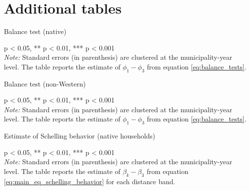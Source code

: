 \documentclass[../main.tex]{subfiles}
\begin{document}
\section{Additional tables}





\begin{table}[H]
    \centering
    \caption{Balance test (native)}
    \resizebox{\textwidth}{!}{}
    \label{tab:balance_test_native_full}
    \begin{tablenotes}[flushleft]
\item \scriptsize * p < 0.05, ** p < 0.01, *** p < 0.001 \\ \textit{Note:} Standard errors (in parenthesis) are clustered at the municipality-year level. The table reports the estimate of $\phi_1 - \phi_3$ from equation \ref{eq:balance_tests}. 
\end{tablenotes}
\end{table}

\begin{table}[H]
    \centering
    \caption{Balance test (non-Western)}
    \resizebox{\textwidth}{!}{}
    \label{tab:balance_test_non_west_full}
    \begin{tablenotes}[flushleft]
\item \scriptsize * p < 0.05, ** p < 0.01, *** p < 0.001 \\ \textit{Note:} Standard errors (in parenthesis) are clustered at the municipality-year level. The table reports the estimate of $\phi_1 - \phi_3$ from equation \ref{eq:balance_tests}. 
\end{tablenotes}
\end{table}

\begin{table}[H]
    \caption{Estimate of Schelling behavior (native households)}
    \centering
    \begin{threeparttable}
        
        
    \label{tab:main_results_full}
\begin{tablenotes}[flushleft]
\item \scriptsize * p < 0.05, ** p < 0.01, *** p < 0.001 \\ \textit{Note:} Standard errors (in parenthesis) are clustered at the municipality-year level. The table reports the estimate of $\beta_k - \beta_3$ from equation \ref{eq:main_eq_schelling_behavior} for each distance band. 
\end{tablenotes}
\end{threeparttable}
\end{table}
\end{document}
